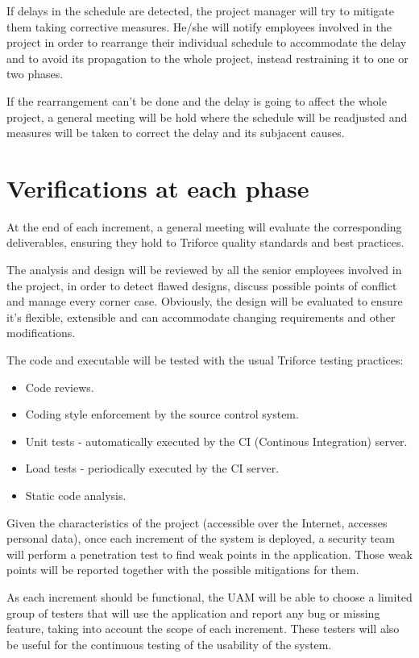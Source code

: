 If delays in the schedule are detected, the project manager will try to mitigate them taking corrective measures. He/she will notify employees involved in the project in order to rearrange their individual schedule to accommodate the delay and to avoid its propagation to the whole project, instead restraining it to one or two phases.

If the rearrangement can't be done and the delay is going to affect the whole project, a general meeting will be hold where the schedule will be readjusted and measures will be taken to correct the delay and its subjacent causes.

\section{Verifications at each phase}

At the end of each increment, a general meeting will evaluate the corresponding deliverables, ensuring they hold to Triforce quality standards and best practices.

The analysis and design will be reviewed by all the senior employees involved in the project, in order to detect flawed designs, discuss possible points of conflict and manage every corner case. Obviously, the design will be evaluated to ensure it's flexible, extensible and can accommodate changing requirements and other modifications.

The code and executable will be tested with the usual Triforce testing practices:

\begin{itemize}[noitemsep]
\item Code reviews.
\item Coding style enforcement by the source control system.
\item Unit tests - automatically executed by the CI (Continous Integration) server.
\item Load tests - periodically executed by the CI server.
\item Static code analysis.
\end{itemize}

Given the characteristics of the project (accessible over the Internet, accesses personal data), once each increment of the system is deployed, a security team will perform a penetration test to find weak points in the application. Those weak points will be reported together with the possible mitigations for them.

As each increment should be functional, the UAM will be able to choose a limited group of testers that will use the application and report any bug or missing feature, taking into account the scope of each increment. These testers will also be useful for the continuous testing of the usability of the system.


